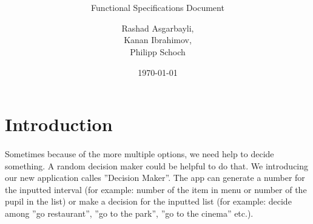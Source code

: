 \documentclass[hidelinks, a4paper, 11pt]{scrartcl}
\author{Rashad Asgarbayli,\\ Kanan Ibrahimov,\\ Philipp Schoch}
\title{\vspace{3cm}
\app
\vspace{20mm}}
\subtitle{Functional Specifications Document}
\date{\today}
\begin{document}
\maketitle
\thispagestyle{empty}

\newpage

\tableofcontents

\newpage


\section{Introduction}

\paragraph{}Sometimes because of the more multiple options, we need help to decide something. A random decision maker could be helpful to do that. We introducing our new application calles ''Decision Maker''. The app can generate a number for the inputted interval (for example: number of the item in menu or number of the pupil in the list) or make a decision for the inputted list (for example: decide among ''go restaurant'', ''go to the park'', ''go to the cinema'' etc.).




















\end{document}
